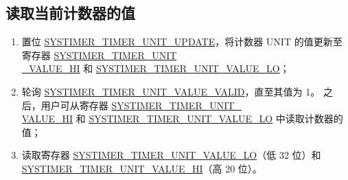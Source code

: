 \documentclass[main\_\_CN.tex]{subfiles}
\begin{document}
\subsection{读取当前计数器的值}\label{sec:to-read-system-timer-value}
\begin{enumerate}
    \item 置位 \hyperref[fielddesc:SYSTIMERTIMERUNIT0UPDATE]{SYSTIMER\_TIMER\_UNIT\_UPDATE}，将计数器 UNIT 的值更新至寄存器 \hyperref[fielddesc:SYSTIMERTIMERUNIT0VALUEHI]{SYSTIMER\_TIMER\_UNIT\\\_VALUE\_HI} 和 \hyperref[fielddesc:SYSTIMERTIMERUNIT0VALUELO]{SYSTIMER\_TIMER\_UNIT\_VALUE\_LO}；
    \item 轮询 \hyperref[fielddesc:SYSTIMERTIMERUNIT0VALUEVALID]{SYSTIMER\_TIMER\_UNIT\_VALUE\_VALID}，直至其值为 1。
    之后，用户可从寄存器 \hyperref[fielddesc:SYSTIMERTIMERUNIT0VALUEHI]{SYSTIMER\_TIMER\_UNIT\_\\VALUE\_HI} 和 \hyperref[fielddesc:SYSTIMERTIMERUNIT0VALUELO]{SYSTIMER\_TIMER\_UNIT\_VALUE\_LO} 中读取计数器的值；
    \item 读取寄存器 \hyperref[fielddesc:SYSTIMERTIMERUNIT0VALUELO]{SYSTIMER\_TIMER\_UNIT\_VALUE\_LO}（低 32 位）和 \hyperref[fielddesc:SYSTIMERTIMERUNIT0VALUEHI]{SYSTIMER\_TIMER\_UNIT\_VALUE\_HI}（高 20 位）。

\end{enumerate}
\end{document}
